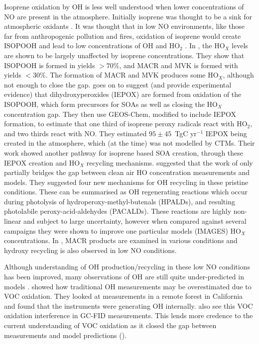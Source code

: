     
    Isoprene oxidation by OH is less well understood when lower concentrations of NO are present in the atmosphere.
    Initially isoprene was thought to be a sink for atmospheric oxidants \citep[e.g.][]{Guenther2000}.
    It was thought that in low NO environments, like those far from anthropogenic pollution and fires, oxidation of isoprene would create ISOPOOH and lead to low concentrations of OH and HO$_2$ \citet{Paulot2009b}.
    In \citet{Paulot2009b}, the HO$_X$ levels are shown to be largely unaffected by isoprene concentrations.
    They show that ISOPOOH is formed in yields $> 70\%$, and MACR and MVK is formed with yields $< 30\%$.
    The formation of MACR and MVK produces some HO$_X$, although not enough to close the gap.
    \citet{Paulot2009b} goes on to suggest (and provide experimental evidence) that dihydroxyperoxides (IEPOX) are formed from oxidation of the ISOPOOH, which form precursors for SOAs as well as closing the HO$_X$ concentration gap.
    They then use GEOS-Chem, modified to include IEPOX formation, to estimate that one third of isoprene peroxy radicals react with HO$_2$, and two thirds react with NO. 
    They estimated $95 \pm 45$~TgC yr$^{-1}$ IEPOX being created in the atmosphere, which (at the time) was not modelled by CTMs.
    Their work showed another pathway for isoprene based SOA creation, through these IEPOX creation and HO$_X$ recycling mechanisms.
    \citet{Peeters2010} suggested that the work of \citet{Paulot2009b} only partially bridges the gap between clean air HO concentration measurements and models.
    They suggested four new mechanisms for OH recycling in these pristine conditions.
    These can be summarised as OH regenerating reactions which occur during photolysis of hydroperoxy-methyl-butenals (HPALDs), and resulting photolabile peroxy-acid-aldehydes (PACALDs).
    These reactions are highly non-linear and subject to large uncertainty, however when compared against several campaigns they were shown to improve one particular models (IMAGES) HO$_X$ concentrations.
    In \cite{Crounse2012}, MACR products are examined in various conditions and hydroxy recycling is also observed in low NO conditions.
    
    Although understanding of OH production/recycling in these low NO conditions has been improved, many observations of OH are still quite under-predicted in models \citep{Mao2012}.
    \cite{Mao2012} showed how traditional OH measurements may be overestimated due to VOC oxidation.
    They looked at measurements in a remote forest in California and found that the instruments were generating OH internally.
    \cite{Nguyen2014} also see this VOC oxidation interference in GC-FID measurements.
    This lends more credence to the current understanding of VOC oxidation as it closed the gap between measurements and model predictions (\cite{Mao2012}).
       

